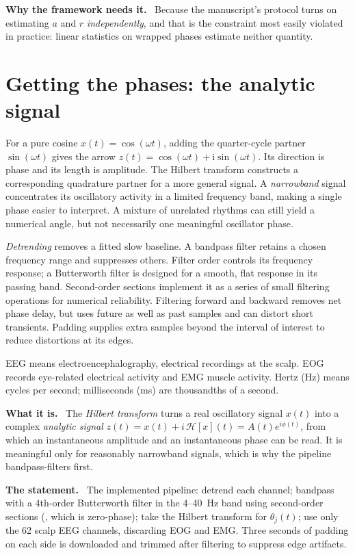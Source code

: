 \documentclass[11pt]{article}
\newcommand{\what}{\par\smallskip\noindent\textbf{What it is.}\ }
\newcommand{\why}{\par\smallskip\noindent\textbf{Why the framework needs it.}\ }
\newcommand{\statement}{\par\smallskip\noindent\textbf{The statement.}\ }
\newcommand{\id}[1]{{\small\ttfamily\seqsplit{#1}}}
\begin{document}
\why
Because the manuscript's protocol turns on estimating $a$ and $r$
\emph{independently}, and that is the constraint most easily violated in
practice: linear statistics on wrapped phases estimate neither quantity.

\section{Getting the phases: the analytic signal}

For a pure cosine $x(t)=\cos(\omega t)$, adding the quarter-cycle partner
$\sin(\omega t)$ gives the arrow
$z(t)=\cos(\omega t)+\mathrm{i}\sin(\omega t)$. Its direction is phase and
its length is amplitude. The Hilbert transform constructs a corresponding
quadrature partner for a more general signal. A \emph{narrowband} signal
concentrates its oscillatory activity in a limited frequency band, making a
single phase easier to interpret. A mixture of unrelated rhythms can still
yield a numerical angle, but not necessarily one meaningful oscillator phase.

\emph{Detrending} removes a fitted slow baseline. A bandpass filter retains
a chosen frequency range and suppresses others. Filter order controls its
frequency response; a Butterworth filter is designed for a smooth, flat
response in its passing band. Second-order sections implement it as a series
of small filtering operations for numerical reliability. Filtering forward
and backward removes net phase delay, but uses future as well as past samples
and can distort short transients. Padding supplies extra samples beyond the
interval of interest to reduce distortions at its edges.

EEG means electroencephalography, electrical recordings at the scalp. EOG
records eye-related electrical activity and EMG muscle activity. Hertz (Hz)
means cycles per second; milliseconds (ms) are thousandths of a second.

\what
The \emph{Hilbert transform} turns a real oscillatory signal $x(t)$ into a
complex \emph{analytic signal} $z(t)=x(t)+i\,\mathcal{H}[x](t)=A(t)e^{i\phi(t)}$,
from which an instantaneous amplitude and an instantaneous phase can be read.
It is meaningful only for reasonably narrowband signals, which is why the
pipeline bandpass-filters first.

\statement
The implemented pipeline: detrend each channel; bandpass with a 4th-order
Butterworth filter in the 4--40~Hz band using second-order sections
(\id{sosfiltfilt}, which is zero-phase); take the Hilbert transform for
$\theta_j(t)$; use only the 62 scalp EEG channels, discarding EOG and EMG.
Three seconds of padding on each side is downloaded and trimmed after filtering
to suppress edge artifacts.
\end{document}
